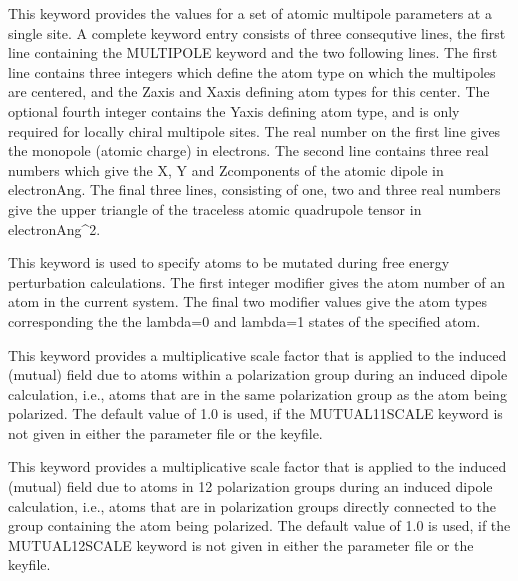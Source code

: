 \documentclass[letterpaper,11pt,english]{sphinxmanual}
\begin{document}
  This keyword provides the values for a set of atomic multipole parameters at a single site. A complete keyword entry consists of three consequtive lines, the first line containing the MULTIPOLE keyword and the two following lines. The first line contains three integers which define the atom type on which the multipoles are centered, and the Z\sphinxhyphen{}axis and X\sphinxhyphen{}axis defining atom types for this center. The optional fourth integer contains the Y\sphinxhyphen{}axis defining atom type, and is only required for locally chiral multipole sites. The real number on the first line gives the monopole (atomic charge) in electrons. The second line contains three real numbers which give the X\sphinxhyphen{}, Y\sphinxhyphen{} and Z\sphinxhyphen{}components of the atomic dipole in electron\sphinxhyphen{}Ang. The final three lines, consisting of one, two and three real numbers give the upper triangle of the traceless atomic quadrupole tensor in electron\sphinxhyphen{}Ang\textasciicircum{}2.

  This keyword is used to specify atoms to be mutated during free energy perturbation calculations. The first integer modifier gives the atom number of an atom in the current system. The final two modifier values give the atom types corresponding the the lambda=0 and lambda=1 states of the specified atom.

  This keyword provides a multiplicative scale factor that is applied to the induced (mutual) field due to atoms within a polarization group during an induced dipole calculation, i.e., atoms that are in the same polarization group as the atom being polarized. The default value of 1.0 is used, if the MUTUAL\sphinxhyphen{}11\sphinxhyphen{}SCALE keyword is not given in either the parameter file or the keyfile.

  This keyword provides a multiplicative scale factor that is applied to the induced (mutual) field due to atoms in 1\sphinxhyphen{}2 polarization groups during an induced dipole calculation, i.e., atoms that are in polarization groups directly connected to the group containing the atom being polarized. The default value of 1.0 is used, if the MUTUAL\sphinxhyphen{}12\sphinxhyphen{}SCALE keyword is not given in either the parameter file or the keyfile.
\end{document}

